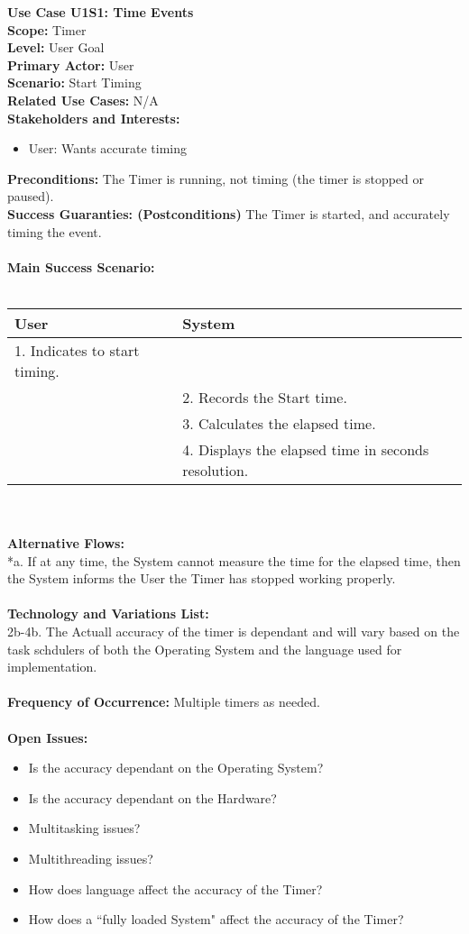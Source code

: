 \documentclass[letterpaper]{article}
\begin{document}
\noindent
\textbf{Use Case U1S1:  Time Events}\\
\textbf{Scope:  }Timer\\
\textbf{Level:  }User Goal\\
\textbf{Primary Actor:  }User\\
\textbf{Scenario:  }Start Timing\\
\textbf{Related Use Cases:  }N/A\\
\textbf{Stakeholders and Interests:}
\begin{itemize}
\item User:  Wants accurate timing
\end{itemize}
\textbf{Preconditions:  }The Timer is running, not timing (the timer
is stopped or paused).\\
\textbf{Success Guaranties:  (Postconditions)} 
The Timer is started, and accurately timing the event.\\\\
\textbf{Main Success Scenario: }\\\\
\begin{tabular}{|p{6cm}|p{6cm}|}\hline
\textbf{User} & \textbf{System}\\\hline
1.  Indicates to start timing. & \\\hline
&2.  Records the Start time.\\\hline
&3.  Calculates the elapsed time.\\\hline
&4.  Displays the elapsed time in seconds resolution.\\\hline
\end{tabular}\\\\
\textbf{Alternative Flows:  }\\
*a.  If at any time, the System cannot measure the time for the
elapsed time, then the System informs the User the Timer has
stopped working properly.\\\\
\textbf{Technology and Variations List:  }\\
2b-4b.  The Actuall accuracy of the timer is dependant and
will vary based on the task schdulers of both the Operating
System and the language used for implementation.\\\\
\textbf{Frequency of Occurrence:  }Multiple timers as needed.\\\\
\textbf{Open Issues:  }\\
\begin{itemize}
\item Is the accuracy dependant on the Operating System?
\item Is the accuracy dependant on the Hardware?
\item Multitasking issues?
\item Multithreading issues?
\item How does language affect the accuracy of the Timer?
\item How does a ``fully loaded System" affect the accuracy
of the Timer?
\end{itemize}
\end{document}
